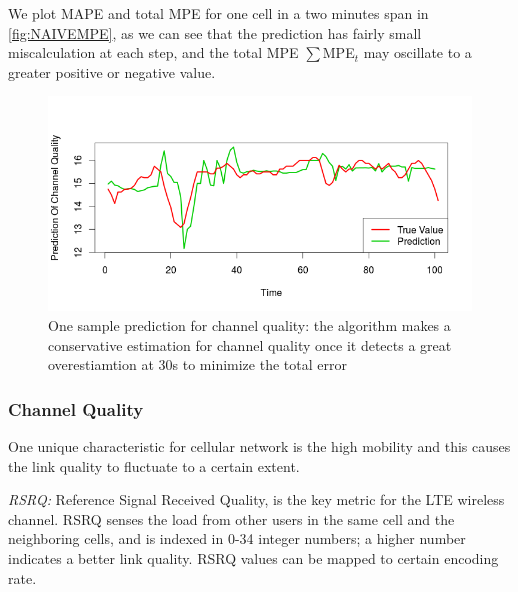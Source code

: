 We plot MAPE and total MPE for one cell in a two minutes span in \autoref{fig:NAIVEMPE}, as we can see that the prediction has fairly small miscalculation at each step, and the total MPE $\sum$MPE$_t$ may oscillate to a greater positive or negative value. 
\begin{figure}[t]
\centering
 \includegraphics[width=0.8\linewidth]{pictures/prediction.png}
\caption{One sample prediction for channel quality: the algorithm makes a conservative estimation for channel quality once  it detects a great overestiamtion at 30s to minimize the total error} \label{fig:prediction}
\end{figure}
\subsubsection{Channel Quality}\label{subsec:CQ}
One unique characteristic for cellular network is the high mobility and this causes the link quality to fluctuate to a certain extent.

\emph{RSRQ:} Reference Signal Received Quality, is the key metric for the LTE wireless channel. RSRQ senses the load from other users in the same cell and the neighboring cells, and is indexed in 0-34 integer numbers; a higher number indicates a better link quality. RSRQ values can be mapped to certain encoding rate.

